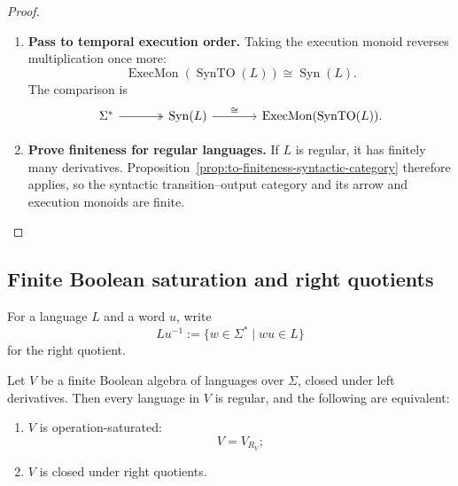 \begin{proof}
\begin{enumerate}
        \item \textbf{Pass to temporal execution order.}
        Taking the execution monoid reverses multiplication once more:
        \[
            \operatorname{ExecMon}(\operatorname{SynTO}(L))
            \cong
            \operatorname{Syn}(L).
        \]
        The comparison is
        \[
        \begin{tikzcd}[column sep=large]
            \Sigma^*
                \arrow[r, two heads]
            &
            \operatorname{Syn}(L)
                \arrow[r, "\cong"]
            &
            \operatorname{ExecMon}(\operatorname{SynTO}(L)).
        \end{tikzcd}
        \]

        \item \textbf{Prove finiteness for regular languages.}
        If \(L\) is regular, it has finitely many derivatives.
        Proposition~\ref{prop:to-finiteness-syntactic-category} therefore
        applies, so the syntactic transition--output category and its arrow
        and execution monoids are finite.
    \end{enumerate}
\end{proof}

\subsection{Finite Boolean saturation and right quotients}
\label{subsec:to-boolean-saturation-right-quotients}

For a language \(L\) and a word \(u\), write
\[
    Lu^{-1}
    :=
    \{w\in\Sigma^*\mid wu\in L\}
\]
for the right quotient.

\begin{theorem}
\label{thm:to-finite-boolean-saturation}
    Let \(V\) be a finite Boolean algebra of languages over \(\Sigma\), closed
    under left derivatives. Then every language in \(V\) is regular, and the
    following are equivalent:
    \begin{enumerate}
        \item \(V\) is operation-saturated:
        \[
            V=V_{R_V};
        \]
        \item \(V\) is closed under right quotients.
    \end{enumerate}
\end{theorem}

